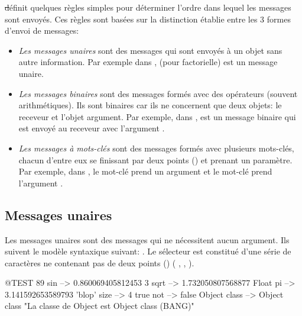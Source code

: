 \documentclass[a4paper,10pt,twoside]{book}
\begin{document}
\st définit quelques règles simples pour déterminer l'ordre dans lequel 
les messages sont envoyés. Ces règles sont basées sur la distinction établie 
entre les 3 formes d'envoi de messages: 
\begin{itemize}
\item \emph{Les messages unaires} sont des messages qui sont envoyés
  à un objet sans autre information. Par exemple dans ,  (pour factorielle) est un message    
  unaire. 
\item  \emph{Les messages binaires} sont des messages formés avec
  des opérateurs (souvent arithmétiques). Ils sont binaires car
  ils ne concernent que deux objets: le receveur et l'objet
  argument. Par exemple, dans , \ct{+} est un message
  binaire qui est envoyé au receveur  avec l'argument . 
\item  \emph{Les messages à mots-clés} sont des messages formés avec plusieurs mots-clés, chacun d'entre eux se finissant par deux points (\ct{:}) et prenant un paramètre.
Par exemple, dans , le mot-clé 
prend un argument  et le mot-clé  prend l'argument .
\end{itemize}

\subsection{Messages unaires}
Les messages unaires sont des messages qui ne nécessitent aucun
argument. Ils suivent le modèle syntaxique suivant: . Le sélecteur est constitué d'une série de
caractères ne contenant pas de deux points (\ct{:}) (\eg
{}, , ).
\begin{code}{@TEST}
89 sin           --> 0.860069405812453
3 sqrt           --> 1.732050807568877
Float pi         --> 3.141592653589793
'blop' size     --> 4
true not        --> false
Object class --> Object class  "La classe de Object est Object class (BANG)"
\end{code}


\end{document}
